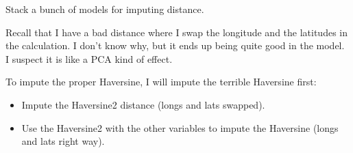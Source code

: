 \documentclass[]{article}
\providecommand{\tightlist}{%
  \setlength{\itemsep}{0pt}\setlength{\parskip}{0pt}}
\begin{document}
Stack a bunch of models for imputing distance.

Recall that I have a bad distance where I swap the longitude and the
latitudes in the calculation. I don't know why, but it ends up being
quite good in the model. I suspect it is like a PCA kind of effect.

To impute the proper Haversine, I will impute the terrible Haversine
first:

\begin{itemize}
\tightlist
\item
  Impute the Haversine2 distance (longs and lats swapped).
\item
  Use the Haversine2 with the other variables to impute the Haversine
  (longs and lats right way).
\end{itemize}
\end{document}
